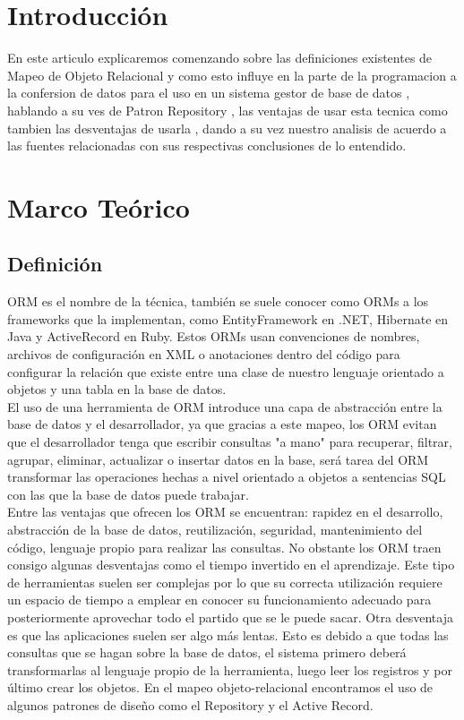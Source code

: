 \documentclass[preprint,12pt]{elsarticle}
\begin{document}
\section{Introducción}

En este articulo explicaremos comenzando sobre las definiciones existentes de Mapeo de Objeto Relacional y como esto influye en la parte de la programacion a la confersion de datos para el uso en un sistema gestor de base de datos
, hablando a su ves de Patron Repository , las ventajas de usar esta tecnica como tambien las desventajas de usarla , dando a su vez nuestro analisis de acuerdo a las fuentes relacionadas con sus respectivas conclusiones de lo entendido.

\section{Marco Teórico}
\subsection{Definición}

ORM es el nombre de la técnica, también se suele conocer como ORMs a los frameworks que la implementan, como EntityFramework en .NET, Hibernate 
en Java y ActiveRecord en Ruby. Estos ORMs usan convenciones de nombres, archivos de configuración en XML o anotaciones dentro del código para
 configurar la relación que existe entre una clase de nuestro lenguaje orientado a objetos y una tabla en la base de datos.
\\
El uso de una herramienta de ORM introduce una capa de abstracción entre la base de datos y el desarrollador, ya que gracias a este mapeo, los ORM evitan que el 
desarrollador tenga que escribir consultas "a mano" para recuperar, filtrar, agrupar, eliminar, actualizar o insertar datos en la base, será tarea del ORM transformar las
 operaciones hechas a nivel orientado a objetos a sentencias SQL con las que la base de datos puede trabajar.\cite{referenciarobles1}
\\
Entre las ventajas que ofrecen los ORM se encuentran: rapidez en el desarrollo, abstracción de la base
de datos, reutilización, seguridad, mantenimiento del código, lenguaje propio para realizar las consultas.
No obstante los ORM traen consigo algunas desventajas como el tiempo invertido en el aprendizaje.
Este tipo de herramientas suelen ser complejas por lo que su correcta utilización requiere un espacio de
tiempo a emplear en conocer su funcionamiento adecuado para posteriormente aprovechar todo el
partido que se le puede sacar. Otra desventaja es que las aplicaciones suelen ser algo más lentas. Esto es
debido a que todas las consultas que se hagan sobre la base de datos, el sistema primero deberá
transformarlas al lenguaje propio de la herramienta, luego leer los registros y por último crear los
objetos.
En el mapeo objeto-relacional encontramos el uso de algunos patrones de diseño como el Repository y
el Active Record.\cite{referenciarobles2}
\end{document}

